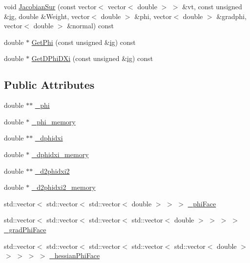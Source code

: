 \begin{DoxyCompactItemize}
\item 
void \mbox{\hyperlink{classfemus_1_1elem__type__1_d_a66b28ca6be3e79fe3bf08b2c856974dd}{Jacobian\+Sur}} (const vector$<$ vector$<$ double $>$ $>$ \&vt, const unsigned \&\mbox{\hyperlink{namespacefemus_a6df31099f676311de214a312d7043941}{ig}}, double \&Weight, vector$<$ double $>$ \&phi, vector$<$ double $>$ \&gradphi, vector$<$ double $>$ \&normal) const
\item 
double $\ast$ \mbox{\hyperlink{classfemus_1_1elem__type__1_d_ac3bf43aa0c1c02c1113228011462a893}{Get\+Phi}} (const unsigned \&\mbox{\hyperlink{namespacefemus_a6df31099f676311de214a312d7043941}{ig}}) const
\item 
double $\ast$ \mbox{\hyperlink{classfemus_1_1elem__type__1_d_a27ff9f2a7f26c961b9b9d96aa87723d2}{Get\+D\+Phi\+D\+Xi}} (const unsigned \&\mbox{\hyperlink{namespacefemus_a6df31099f676311de214a312d7043941}{ig}}) const
\end{DoxyCompactItemize}
\subsection*{Public Attributes}
\begin{DoxyCompactItemize}
\item 
double $\ast$$\ast$ \mbox{\hyperlink{classfemus_1_1elem__type__1_d_a80a76204752db5a3fa4f4586ae554480}{\+\_\+phi}}
\item 
double $\ast$ \mbox{\hyperlink{classfemus_1_1elem__type__1_d_aec61375db0a0de76bdeda36c5c951b8c}{\+\_\+phi\+\_\+memory}}
\item 
double $\ast$$\ast$ \mbox{\hyperlink{classfemus_1_1elem__type__1_d_a44078add8faa0d14244a1fd41b5d4fb7}{\+\_\+dphidxi}}
\item 
double $\ast$ \mbox{\hyperlink{classfemus_1_1elem__type__1_d_af1a5dc5b688c490834b1c921b16b35ba}{\+\_\+dphidxi\+\_\+memory}}
\item 
double $\ast$$\ast$ \mbox{\hyperlink{classfemus_1_1elem__type__1_d_a60418459ab53117c83aad7cfbb3628ca}{\+\_\+d2phidxi2}}
\item 
double $\ast$ \mbox{\hyperlink{classfemus_1_1elem__type__1_d_a59bd178cd7ec1fcdfb577f56f1f239dd}{\+\_\+d2phidxi2\+\_\+memory}}
\item 
std\+::vector$<$ std\+::vector$<$ std\+::vector$<$ double $>$ $>$ $>$ \mbox{\hyperlink{classfemus_1_1elem__type__1_d_aaf93a8facde3e591de6c874af0834800}{\+\_\+phi\+Face}}
\item 
std\+::vector$<$ std\+::vector$<$ std\+::vector$<$ std\+::vector$<$ double $>$ $>$ $>$ $>$ \mbox{\hyperlink{classfemus_1_1elem__type__1_d_a5eac5011c7ecdfdcf4cc9bfcd6adf861}{\+\_\+grad\+Phi\+Face}}
\item 
std\+::vector$<$ std\+::vector$<$ std\+::vector$<$ std\+::vector$<$ std\+::vector$<$ double $>$ $>$ $>$ $>$ $>$ \mbox{\hyperlink{classfemus_1_1elem__type__1_d_a4610d856f52e0a7ec8d9b02f0ded95c2}{\+\_\+hessian\+Phi\+Face}}
\end{DoxyCompactItemize}
